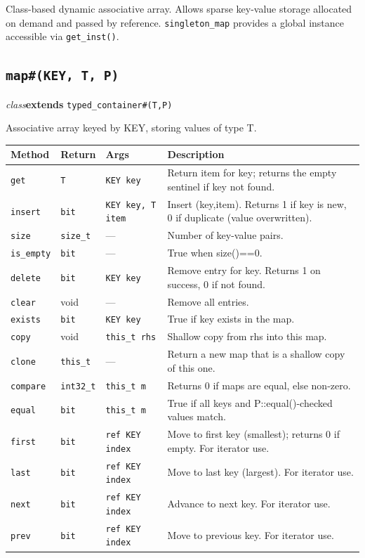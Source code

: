 \documentclass[11pt,letterpaper]{report}
\begin{document}
Class-based dynamic associative array. Allows sparse key-value storage allocated on demand and passed by reference. \texttt{singleton\_map} provides a global instance accessible via \texttt{get\_inst()}.

\subsection*{\texttt{map\#(KEY, T, P)}}
\noindent\small\textit{class}\quad \textbf{extends} \texttt{typed\_container\#(T,P)}\par

Associative array keyed by KEY, storing values of type T.

\begin{xltabular}{\linewidth}{>{\small}p{1.35in} >{\small}p{1.25in} >{\small}p{0.95in} >{\small}X}
\toprule
\textbf{Method} & \textbf{Return} & \textbf{Args} & \textbf{Description} \\
\midrule
\endhead
\bottomrule
\endfoot
\texttt{get} & \texttt{T} & \texttt{KEY key} & Return item for key; returns the empty sentinel if key not found. \\
\texttt{insert} & \texttt{bit} & \texttt{KEY key, T item} & Insert (key,item). Returns 1 if key is new, 0 if duplicate (value overwritten). \\
\texttt{size} & \texttt{size\_t} & --- & Number of key-value pairs. \\
\texttt{is\_empty} & \texttt{bit} & --- & True when size()==0. \\
\texttt{delete} & \texttt{bit} & \texttt{KEY key} & Remove entry for key. Returns 1 on success, 0 if not found. \\
\texttt{clear} & void & --- & Remove all entries. \\
\texttt{exists} & \texttt{bit} & \texttt{KEY key} & True if key exists in the map. \\
\texttt{copy} & void & \texttt{this\_t rhs} & Shallow copy from rhs into this map. \\
\texttt{clone} & \texttt{this\_t} & --- & Return a new map that is a shallow copy of this one. \\
\texttt{compare} & \texttt{int32\_t} & \texttt{this\_t m} & Returns 0 if maps are equal, else non-zero. \\
\texttt{equal} & \texttt{bit} & \texttt{this\_t m} & True if all keys and P::equal()-checked values match. \\
\texttt{first} & \texttt{bit} & \texttt{ref KEY index} & Move to first key (smallest); returns 0 if empty. For iterator use. \\
\texttt{last} & \texttt{bit} & \texttt{ref KEY index} & Move to last key (largest). For iterator use. \\
\texttt{next} & \texttt{bit} & \texttt{ref KEY index} & Advance to next key. For iterator use. \\
\texttt{prev} & \texttt{bit} & \texttt{ref KEY index} & Move to previous key. For iterator use. \\
\end{xltabular}
\end{document}
